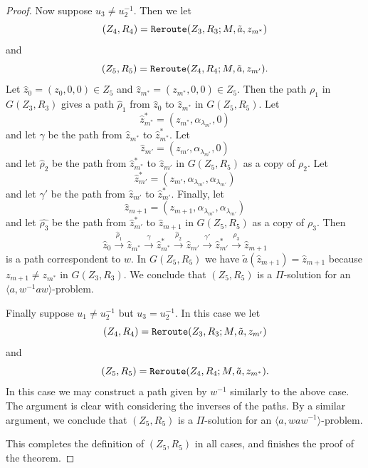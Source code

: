 \documentclass[11pt]{amsart}
\theoremstyle{definition}
\theoremstyle{definition}
\numberwithin{equation}{section}
\begin{document}
\begin{proof}
Now suppose $u_3\neq u_2^{-1}$. Then we let
$$ (Z_4, R_4)=\mbox{\tt Reroute}(Z_3, R_3; M, \tilde{a}, z_{m^*}) $$
and 
$$ (Z_5, R_5)=\mbox{\tt Reroute}(Z_4, R_4; M, \tilde{a}, z_{m'}). $$
Let $\hat{z}_0=(z_0, 0,0)\in Z_5$ and $\hat{z}_{m^*}=(z_{m^*}, 0, 0)\in Z_5$. Then the path $\rho_1$ in $G(Z_3, R_3)$ gives a path $\hat{\rho}_1$ from $\hat{z}_0$ to $\hat{z}_{m^*}$ in $G(Z_5, R_5)$. Let 
$$ \hat{z}_{m^*}^*=(z_{m^*}, \alpha_{\lambda_{m^*}}, 0) $$
and let $\gamma$ be the path from $\hat{z}_{m^*}$ to $\hat{z}_{m^*}^*$. Let
$$ \hat{z}_{m'}=(z_{m'}, \alpha_{\lambda_{m^*}}, 0) $$
and let $\hat{\rho}_2$ be the path from $\hat{z}_{m^*}^*$ to $\hat{z}_{m'}$ in $G(Z_5, R_5)$ as a copy of $\rho_2$. Let $$\hat{z}_{m'}^*=(z_{m'},\alpha_{\lambda_{m^*}}, \alpha_{\lambda_{m'}})$$
and let $\gamma'$ be the path from $\hat{z}_{m'}$ to $\hat{z}_{m'}^*$. Finally, let
$$ \hat{z}_{m+1}=(z_{m+1}, \alpha_{\lambda_{m^*}}, \alpha_{\lambda_{m'}})$$
and let $\hat{\rho_3}$ be the path from $\hat{z}_{m'}^*$ to $\hat{z}_{m+1}$ in $G(Z_5, R_5)$ as a copy of $\rho_3$. Then
$$ \hat{z}_0\stackrel{\hat{\rho}_1}{\longrightarrow} \hat{z}_{m^*}\stackrel{\gamma}{\longrightarrow} \hat{z}_{m^*}^* \stackrel{\hat{\rho}_2}{\longrightarrow} \hat{z}_{m'} \stackrel{\gamma'}{\longrightarrow} \hat{z}_{m'}^*\stackrel{\hat{\rho}_3}{\longrightarrow} \hat{z}_{m+1} $$
is a path correspondent to $w$. In $G(Z_5, R_5)$ we have $\tilde{a}(\hat{z}_{m+1})=\hat{z}_{m+1}$ because $z_{m+1}\neq z_{m^*}$ in $G(Z_3, R_3)$. We conclude that $(Z_5, R_5)$ is a $\Pi$-solution for an $\langle a, w^{-1}aw\rangle$-problem.

Finally suppose $u_1\neq u_2^{-1}$ but $u_3=u_2^{-1}$. In this case we let
$$ (Z_4, R_4)=\mbox{\tt Reroute}(Z_3, R_3; M, \tilde{a}, z_{m'}) $$
and 
$$ (Z_5, R_5)=\mbox{\tt Reroute}(Z_4, R_4; M, \tilde{a}, z_{m^*}). $$
In this case we may construct  a path given by $w^{-1}$ similarly to the above case. The argument is clear with considering the inverses of the paths. By a similar argument, we conclude that $(Z_5, R_5)$ is a $\Pi$-solution for an $\langle a, waw^{-1}\rangle$-problem. 

This completes the definition of $(Z_5, R_5)$ in all cases, and finishes the proof of the theorem.
\end{proof}
\end{document}
